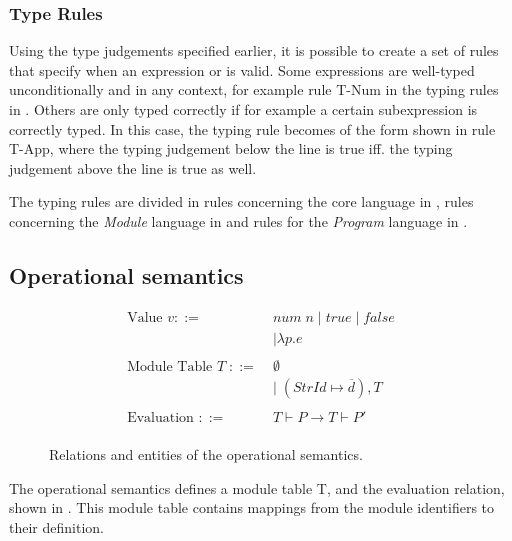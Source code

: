 \subsubsection{Type Rules}
Using the type judgements specified earlier, it is possible to create a set of rules that specify when an expression  or  is valid.
Some expressions are well-typed unconditionally and in any context, for example rule T-Num in the typing rules in .
Others are only typed correctly if for example a certain subexpression is correctly typed. In this case, the typing rule becomes of the form shown in rule T-App, where the typing judgement below the line is true iff. the typing judgement above the line is true as well.

The typing rules are divided in rules concerning the core language in , rules concerning the \emph{Module} language in  and rules for the \emph{Program} language in .


\clearpage
\subsection{Operational semantics}
\label{sec:MLOperationalSemantics}
\begin{figure}[htb]
\begin{align*}
\text{Value }v ::=\;&\mathit{num\;n} \; | \; \mathit{true} \; | \; \mathit{false} \\
&| \lambda p.e\\
\\
\text{Module Table } T\; ::= \;&\emptyset \\
&| \; (\mathit{StrId} \mapsto %
\overline{d}
), T \\
\\
\text{Evaluation } ::= & T \vdash P \rightarrow T \vdash P' \\
\end{align*}
\caption{Relations and entities of the operational semantics.\label{fig:MiniMLOperationalSemanticEntitiesAndRelations}}
\end{figure}

The operational semantics defines a module table T, and the evaluation relation, shown in .
This module table contains mappings from the %
module identifiers to their definition. 

